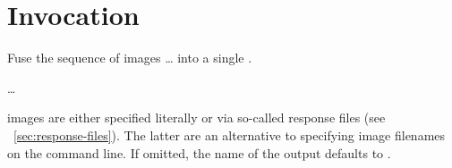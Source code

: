 

\chapter[Invocation]{\label{sec:invocation}%
  Invocation}



\noindent Fuse the sequence of images \dots{} into a single .

\smallskip

\code{\app}  
\dots

\smallskip

%
%
%
%
\noindent {} images are either specified literally or via so-called response files
(see \sectionName~\ref{sec:response-files}).  The latter are an alternative to specifying image
filenames on the command line.  If omitted, the name of the output  defaults to
.










